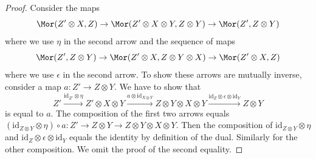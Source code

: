 \begin{proof}
Consider the maps
$$
\Mor(Z' \otimes X, Z) \to
\Mor(Z' \otimes X \otimes Y, Z \otimes Y) \to
\Mor(Z', Z \otimes Y)
$$
where we use $\eta$ in the second arrow
and the sequence of maps
$$
\Mor(Z', Z \otimes Y) \to
\Mor(Z' \otimes X, Z \otimes Y \otimes X) \to
\Mor(Z' \otimes X, Z)
$$
where we use $\epsilon$ in the second arrow.
To show these arrows are mutually inverse, consider a map
$a : Z' \to Z \otimes Y$. We have to show that
$$
Z' \xrightarrow{\text{id}_{Z'} \otimes \eta}
Z' \otimes X \otimes Y \xrightarrow{a \otimes \text{id}_{X \otimes Y}}
Z \otimes Y \otimes X \otimes Y
\xrightarrow{\text{id}_Z \otimes \epsilon \otimes \text{id}_Y}
Z \otimes Y
$$
is equal to $a$. The composition of the first two arrows equals
$(\text{id}_{Z \otimes Y} \otimes \eta) \circ a :
Z' \to Z \otimes Y \to Z \otimes Y \otimes X \otimes Y$.
Then the composition of $\text{id}_{Z \otimes Y} \otimes \eta$
and $\text{id}_Z \otimes \epsilon \otimes \text{id}_Y$ equals
the identity by definition of the dual. Similarly for the other
composition. We omit the proof of the second equality.
\end{proof}

